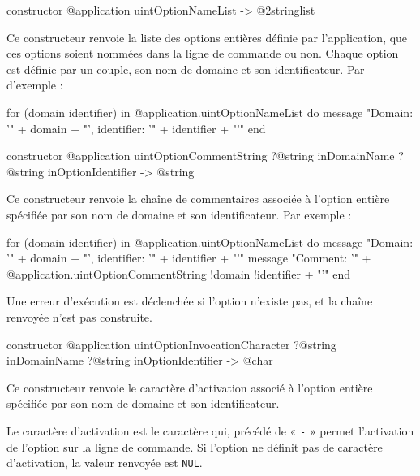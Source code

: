 
\begin{galgasbox}
constructor @application uintOptionNameList -> @2stringlist
\end{galgasbox}

Ce constructeur renvoie la liste des options entières définie par l'application, que ces options soient nommées dans la ligne de commande ou non. Chaque option est définie par un couple, son nom de domaine et son identificateur. Par d'exemple :
\begin{galgas}
for (domain identifier) in @application.uintOptionNameList do
  message "Domain: '" + domain + "', identifier: '" + identifier + "'\n"
end
\end{galgas}



\begin{galgasbox}
constructor @application uintOptionCommentString
    ?@string inDomainName
    ?@string inOptionIdentifier -> @string
\end{galgasbox}

Ce constructeur renvoie la chaîne de commentaires associée à l'option entière spécifiée par son nom de domaine et son identificateur. Par exemple :
\begin{galgas}
for (domain identifier) in @application.uintOptionNameList do
  message "Domain: '" + domain + "', identifier: '" + identifier + "'\n"
  message "Comment: '"
    + @application.uintOptionCommentString {!domain !identifier} + "'\n"
end
\end{galgas}

Une erreur d'exécution est déclenchée si l'option n'existe pas, et la chaîne renvoyée n'est pas construite.



\begin{galgasbox}
constructor @application uintOptionInvocationCharacter
    ?@string inDomainName
    ?@string inOptionIdentifier -> @char
\end{galgasbox}

Ce constructeur renvoie le caractère d'activation associé à l'option entière spécifiée par son nom de domaine et son identificateur.

Le caractère d'activation est le caractère qui, précédé de « \texttt{-} » permet l'activation de l'option sur la ligne de commande. Si l'option ne définit pas de caractère d'activation, la valeur renvoyée est \texttt{NUL}.

